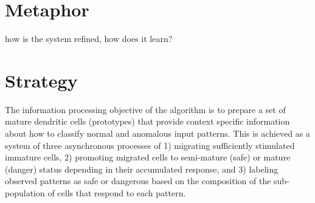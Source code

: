 \documentclass[a4paper, 11pt]{article}
\begin{document}
\section{Metaphor}
\label{sec:metaphor}
how is the system refined, how does it learn?

\section{Strategy}
\label{sec:strategy}
The information processing objective of the algorithm is to prepare a set of mature dendritic cells (prototypes) that provide context specific information about how to classify normal and anomalous input patterns.
This is achieved as a system of three asynchronous processes of 1) migrating sufficiently stimulated immature cells, 2) promoting migrated cells to semi-mature (safe) or mature (danger) status depending in their accumulated response, and 3) labeling observed patterns as safe or dangerous based on the composition of the sub-population of cells that respond to each pattern.
\end{document}

